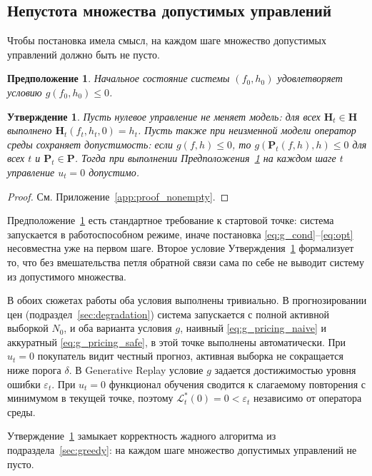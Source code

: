 \documentclass[a4paper,14pt,oneside,openany]{extarticle}
\newtheorem{proposition}{Утверждение}
\newtheorem{assumption}{Предположение}
\newcommand{\bH}{\mathbf{H}}
\newcommand{\bP}{\mathbf{P}}
\newcommand{\cL}{\mathcal{L}}
\begin{document}
\subsection{Непустота множества допустимых управлений}

Чтобы постановка имела смысл, на каждом шаге множество допустимых управлений должно быть не пусто.

\begin{assumption}\label{ass:init}
    Начальное состояние системы $(f_0, h_0)$ удовлетворяет условию $g(f_0, h_0) \le 0$.
\end{assumption}

\begin{proposition}\label{prop:nonempty}
    Пусть нулевое управление не меняет модель: для всех $\bH_t \in \bH$ выполнено $\bH_t(f_t, h_t, 0) = h_t$. Пусть также при неизменной модели оператор среды сохраняет допустимость: если $g(f, h) \le 0$, то $g(\bP_t(f, h), h) \le 0$ для всех $t$ и $\bP_t \in \bP$. Тогда при выполнении Предположения~\ref{ass:init} на каждом шаге $t$ управление $u_t = 0$ допустимо.
\end{proposition}

\begin{proof}См. Приложение~\ref{app:proof_nonempty}.\end{proof}

Предположение~\ref{ass:init} есть стандартное требование к стартовой точке: система запускается в работоспособном режиме, иначе постановка \eqref{eq:g_cond}--\eqref{eq:opt} несовместна уже на первом шаге. Второе условие Утверждения~\ref{prop:nonempty} формализует то, что без вмешательства петля обратной связи сама по себе не выводит систему из допустимого множества.

В обоих сюжетах работы оба условия выполнены тривиально. В прогнозировании цен (подраздел~\ref{sec:degradation}) система запускается с полной активной выборкой $N_0$, и оба варианта условия $g$, наивный \eqref{eq:g_pricing_naive} и аккуратный \eqref{eq:g_pricing_safe}, в этой точке выполнены автоматически. При $u_t = 0$ покупатель видит честный прогноз, активная выборка не сокращается ниже порога $\delta$. В Generative Replay условие $g$ задается достижимостью уровня ошибки $\varepsilon_t$. При $u_t = 0$ функционал обучения сводится к слагаемому повторения с минимумом в текущей точке, поэтому $\cL^*_t(0) = 0 < \varepsilon_t$ независимо от оператора среды.

Утверждение~\ref{prop:nonempty} замыкает корректность жадного алгоритма из подраздела~\ref{sec:greedy}: на каждом шаге множество допустимых управлений не пусто.
\end{document}

